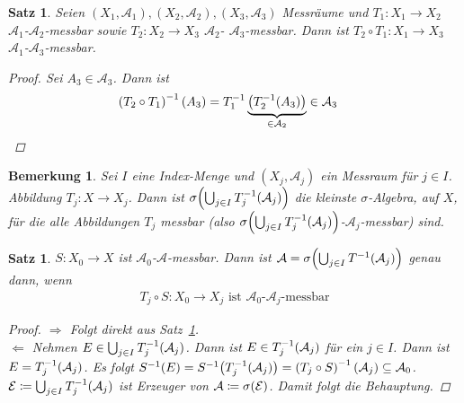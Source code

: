 \documentclass[11pt, twoside, a4paper]{article}
\theoremstyle{plain}
\newtheorem{bemerkung}[blockelement]{Bemerkung}
\newtheorem{satz}[blockelement]{Satz}
\numberwithin{equation}{subsection}
\newcommand{\pair}[1]{\left(#1\right)}
\newcommand{\of}[1]{\mathopen{}\mathclose{}\bgroup\left(#1\aftergroup\egroup\right)}
\newcommand{\impl}[0]{\Rightarrow{}}
\newcommand{\anf}[1]{\glqq{}#1\grqq}
\newcommand{\mA}{\mathcal{A}}
\newcommand{\mE}{\mathcal{E}}
\begin{document}
    \begin{satz}
        \label{satz:verknuepfung-messbar}
        Seien $\pair{X_1, \mA_1}, \pair{X_2, \mA_2}, \pair{X_3, \mA_3}$ Messräume und $T_1: X_1 \to X_2$ $\mA_1$-$\mA_2$-messbar sowie $T_2: X_2 \to X_3$ $\mA_2 $- $\mA_3$-messbar. Dann ist $T_2 \circ T_1: X_1 \to X_3$ $\mA_1 $-$ \mA_3$-messbar.

        \begin{proof}
            Sei $A_3\in\mA_3$. Dann ist
            \begin{align*}
                \pair{T_2 \circ T_1}^{-1}\of{A_3} &= T_1^{-1}\underbrace{\of{T_2^{-1}\of{A_3}}}_{\in\mA_2}\in\mA_3\qedhere
            \end{align*}
        \end{proof}
    \end{satz}

    \begin{bemerkung}
        Sei $I$ eine Index-Menge und $\pair{X_j, \mA_j}$ ein Messraum für $j\in I$. Abbildung $T_j: X \to X_j$. Dann ist $\sigma\of{\bigcup_{j\in I} T_j^{-1}\of{\mA_j}}$ die kleinste $\sigma$-Algebra, auf $X$, für die alle Abbildungen $T_j$ messbar (also $\sigma\of{\bigcup_{j\in I} T_j^{-1}\of{\mA_j}}$-$\mA_j$-messbar) sind.
    \end{bemerkung}

    \begin{satz}
        $S: X_0 \to X$ ist $\mA_0$-$\mA$-messbar. Dann ist $\mA = \sigma\of{\bigcup_{j\in I} T^{-1}\of{\mA_j}}$ genau dann, wenn
        \begin{align*}
            T_j \circ S: X_0 \to X_j\text{ ist } \mA_0 \text{-} \mA_j\text{-messbar}
        \end{align*}
        \begin{proof}
            \anf{$\impl$} Folgt direkt aus Satz~\ref{satz:verknuepfung-messbar}.\\[.5\baselineskip]
            \anf{$\Leftarrow$} Nehmen $E \in \bigcup_{j\in I} T_j^{-1}\of{\mA_j}$. Dann ist $E \in T^{-1}_j\of{\mA_j}$ für ein $j\in I$. Dann ist $E = T_j^{-1}\of{\mA_j}$. Es folgt $S^{-1}\of{E} = S^{-1}\of{T_j^{-1}\of{\mA_j}} = \pair{T_j \circ S}^{-1}\of{\mA_j} \subseteq \mA_0$.\\
            $\mE \coloneqq \bigcup_{j\in I} T_j^{-1}\of{\mA_j}$ ist Erzeuger von $\mA \coloneqq \sigma\of{\mE}$. Damit folgt die Behauptung.
        \end{proof}
    \end{satz}
\end{document}
